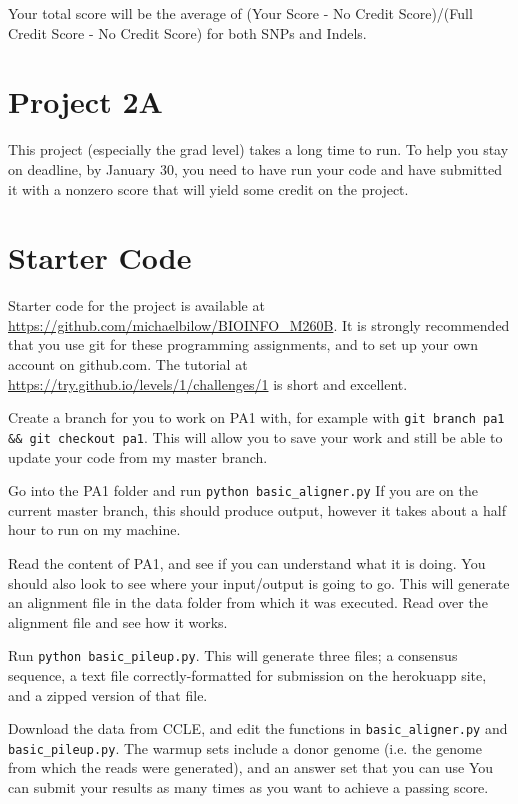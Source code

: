 \documentclass{article}
\begin{document}
Your total score will be the average of (Your Score - No Credit Score)/(Full Credit Score - No Credit Score) for both SNPs and Indels.


\section*{Project 2A}

This project (especially the grad level) takes a long time to run. To help you stay on deadline, by January 30, you need to have run your code and have submitted it with a nonzero score that will yield some credit on the project.  

\section*{Starter Code}

Starter code for the project is available at \url{https://github.com/michaelbilow/BIOINFO_M260B}. It is strongly recommended that you use git for these programming assignments, and to set up your own account on github.com. The tutorial at \url{https://try.github.io/levels/1/challenges/1} is short and excellent.

Create a branch for you to work on PA1 with, for example with \verb!git branch pa1 && git checkout pa1!. This will allow you to save your work and still be able to update your code from my master branch.

Go into the PA1 folder and run \verb!python basic_aligner.py! If you are on the current master branch, this should produce output, however it takes about a half hour to run on my machine.

Read the content of PA1, and see if you can understand what it is doing. You should also look to see where your input/output is going to go. This will generate an alignment file in the data folder from which it was executed. Read over the alignment file and see how it works.

Run \verb|python basic_pileup.py|. This will generate three files; a consensus sequence, a text file correctly-formatted for submission on the herokuapp site, and a zipped version of that file.

Download the data from CCLE, and edit the functions in \verb|basic_aligner.py| and 
\verb|basic_pileup.py|. The warmup sets include a donor genome (i.e. the genome from which the reads were generated), and an answer set that you can use 
You can submit your results as many times as you want to achieve a passing score.
\end{document}
